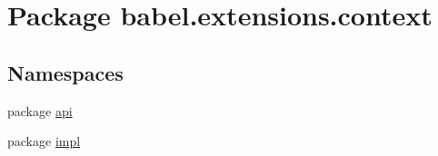 \hypertarget{namespacebabel_1_1extensions_1_1context}{\section{Package babel.\-extensions.\-context}
\label{namespacebabel_1_1extensions_1_1context}
}
\subsection*{Namespaces}
\begin{DoxyCompactItemize}
\item 
package \hyperlink{namespacebabel_1_1extensions_1_1context_1_1api}{api}
\item 
package \hyperlink{namespacebabel_1_1extensions_1_1context_1_1impl}{impl}
\end{DoxyCompactItemize}

